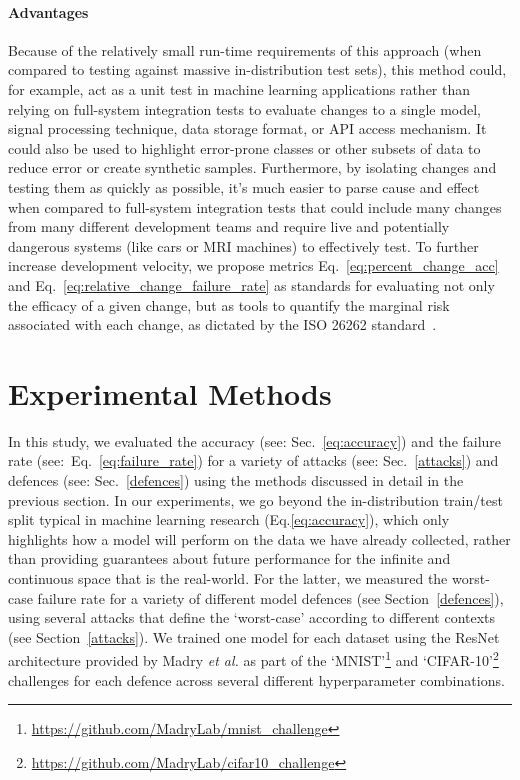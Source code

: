 \paragraph{Advantages}
Because of the relatively small run-time requirements of this approach (when compared to testing against massive in-distribution test sets), this method could, for example, act as a unit test in machine learning applications rather than relying on full-system integration tests to evaluate changes to a single model, signal processing technique, data storage format, or API access mechanism.
It could also be used to highlight error-prone classes or other subsets of data to reduce error or create synthetic samples.
Furthermore, by isolating changes and testing them as quickly as possible, it's much easier to parse cause and effect when compared to full-system integration tests that could include many changes from many different development teams and require live and potentially dangerous systems (like cars or MRI machines) to effectively test.
To further increase development velocity, we propose metrics Eq.~\ref{eq:percent_change_acc} and Eq.~\ref{eq:relative_change_failure_rate} as standards for evaluating not only the efficacy of a given change, but as tools to quantify the marginal risk associated with each change, as dictated by the ISO 26262 standard~\cite{iso26262}.

\section{Experimental Methods}

\label{methods}
In this study, we evaluated the accuracy (see: Sec.~\ref{eq:accuracy}) and the failure rate (see:~Eq.~\ref{eq:failure_rate}) for a variety of attacks (see: Sec.~\ref{attacks}) and defences (see: Sec.~\ref{defences}) using the methods discussed in detail in the previous section.
In our experiments, we go beyond the in-distribution train/test split typical in machine learning research (Eq.\ref{eq:accuracy}), which only highlights how a model will perform on the data we have already collected, rather than providing guarantees about future performance for the infinite and continuous space that is the real-world.
For the latter, we measured the worst-case failure rate for a variety of different model defences (see Section~\ref{defences}), using several attacks that define the ‘worst-case’ according to different contexts (see Section~\ref{attacks}).
We trained one model for each dataset using the ResNet~\cite{resnet} architecture provided by Madry \textit{et al.}
as part of the `MNIST'\footnote{\href{https://github.com/MadryLab/mnist_challenge}{https://github.com/MadryLab/mnist\_challenge}} and `CIFAR-10'\footnote{\href{https://github.com/MadryLab/cifar10_challenge}{https://github.com/MadryLab/cifar10\_challenge}} challenges for each defence across several different hyperparameter combinations.

